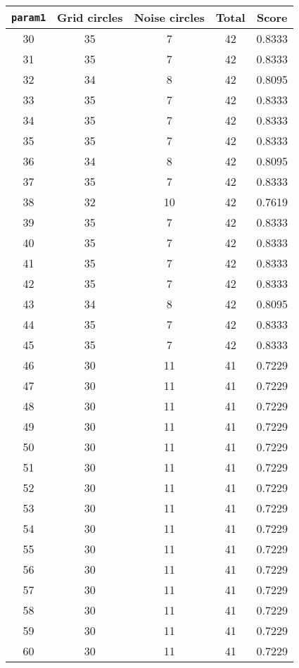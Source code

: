 \documentclass[letterpaper, 12pt]{article}
\begin{document}
\begin{longtable}{|c|c|c|c|c|}
\hline
\textbf{\texttt{param1}} & \textbf{Grid circles} & \textbf{Noise circles} & \textbf{Total} & \textbf{Score} \\
\hline
30 & 35 & 7 & 42 & 0.8333 \\
\hline
31 & 35 & 7 & 42 & 0.8333 \\
\hline
32 & 34 & 8 & 42 & 0.8095 \\
\hline
33 & 35 & 7 & 42 & 0.8333 \\
\hline
34 & 35 & 7 & 42 & 0.8333 \\
\hline
35 & 35 & 7 & 42 & 0.8333 \\
\hline
36 & 34 & 8 & 42 & 0.8095 \\
\hline
37 & 35 & 7 & 42 & 0.8333 \\
\hline
38 & 32 & 10 & 42 & 0.7619 \\
\hline
39 & 35 & 7 & 42 & 0.8333 \\
\hline
40 & 35 & 7 & 42 & 0.8333 \\
\hline
41 & 35 & 7 & 42 & 0.8333 \\
\hline
42 & 35 & 7 & 42 & 0.8333 \\
\hline
43 & 34 & 8 & 42 & 0.8095 \\
\hline
44 & 35 & 7 & 42 & 0.8333 \\
\hline
45 & 35 & 7 & 42 & 0.8333 \\
\hline
46 & 30 & 11 & 41 & 0.7229 \\
\hline
47 & 30 & 11 & 41 & 0.7229 \\
\hline
48 & 30 & 11 & 41 & 0.7229 \\
\hline
49 & 30 & 11 & 41 & 0.7229 \\
\hline
50 & 30 & 11 & 41 & 0.7229 \\
\hline
51 & 30 & 11 & 41 & 0.7229 \\
\hline
52 & 30 & 11 & 41 & 0.7229 \\
\hline
53 & 30 & 11 & 41 & 0.7229 \\
\hline
54 & 30 & 11 & 41 & 0.7229 \\
\hline
55 & 30 & 11 & 41 & 0.7229 \\
\hline
56 & 30 & 11 & 41 & 0.7229 \\
\hline
57 & 30 & 11 & 41 & 0.7229 \\
\hline
58 & 30 & 11 & 41 & 0.7229 \\
\hline
59 & 30 & 11 & 41 & 0.7229 \\
\hline
60 & 30 & 11 & 41 & 0.7229 \\

\end{longtable}
\end{document}
